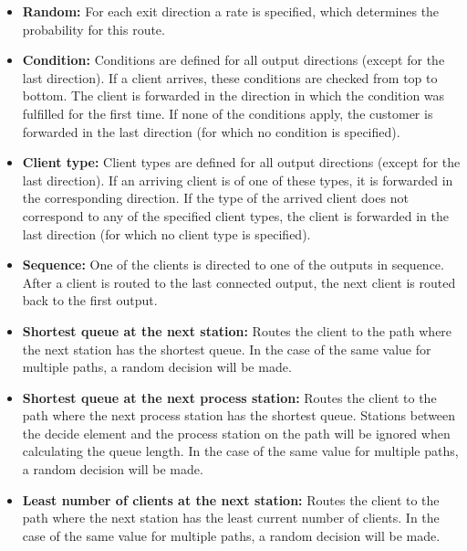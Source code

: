 \begin{itemize}
  \item 
    \textbf{Random:}
    For each exit direction a rate is specified, which determines the probability for this route.

  \item 
    \textbf{Condition:}
    Conditions are defined for all output directions (except for the last direction).
    If a client arrives, these conditions are checked from top to bottom.
    The client is forwarded in the direction in which the condition was fulfilled for the first time.
    If none of the conditions apply, the customer is forwarded in the last direction
    (for which no condition is specified).

  \item 
    \textbf{Client type:}
    Client types are defined for all output directions (except for the last direction).
    If an arriving client is of one of these types, it is forwarded in the corresponding direction.
    If the type of the arrived client does not correspond to any of the specified client types,
    the client is forwarded in the last direction (for which no client type is specified).

  \item 
    \textbf{Sequence:}
    One of the clients is directed to one of the outputs in sequence. After a client is routed to the last
    connected output, the next client is routed back to the first output.

  \item 
    \textbf{Shortest queue at the next station:}
    Routes the client to the path where the next station
    has the shortest queue. In the case of the same value
    for multiple paths, a random decision will be made.

  \item 
    \textbf{Shortest queue at the next process station:}
    Routes the client to the path where the next process station
    has the shortest queue. Stations between the decide element
    and the process station on the path will be ignored when
    calculating the queue length. In the case of the same value
    for multiple paths, a random decision will be made.

  \item  
    \textbf{Least number of clients at the next station:}
    Routes the client to the path where the next station
    has the least current number of clients. In the case of the same value
    for multiple paths, a random decision will be made.    


\end{itemize}
